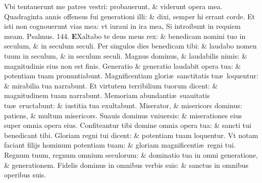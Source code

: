 \documentclass[a5paper,10pt]{book}
\def\ae{æ}
\begin{document}
\begin{multicols*}{2}
\newline \color{red} V\color{black}bi tentauerunt me patres vestri: probauerunt, \& viderunt opera mea. %
\newline \color{red} Q\color{black}uadraginta annis offensus fui generationi illi: \& dixi, semper hi errant corde.
\newline \color{red} E\color{black}t isti non cognouerunt vias mea: vt iuraui in ira mea, Si introibunt in requiem meam.%
\quad \color{red} Psalmus. \hypertarget{ps144}{144.}\color{black}
\lettrine[lines=2]{\bfseries \color{red} E}{}Xaltabo te deus meus rex: \& benedicam nomini tuo in seculum, \& in seculum seculi.
\newline \color{red} P\color{black}er singulos dies benedicam tibi: \& laudabo nomen tuum in seculum, \& in seculum seculi.
\newline \color{red} M\color{black}agnus dominus, \& laudabilis nimis: \& magnitudinis eius non est finis.
\newline \color{red} G\color{black}eneratio \& generatio laudabit opera tua: \& potentiam tuam pronuntiabunt.
\newline \color{red} M\color{black}agnificentiam glori\ae \ sanctitatis tu\ae \ loquentur: \& mirabilia tua narrabunt.
\newline \color{red} E\color{black}t virtutem terribilium tuorum dicent: \& magnitudinem tuam narrabunt.
\newline \color{red} M\color{black}emoriam abundanti\ae \ suauitatis tu\ae \ eructabunt: \& iustitia tua exultabunt.
\newline \color{red} M\color{black}iserator, \& misericors dominus: patiens, \& multum misericors.
\newline \color{red} S\color{black}uauis dominus vniuersis: \& miserationes eius super omnia opera eius.
\newline \color{red} C\color{black}onfiteantur tibi domine omnia opera tua: \& sancti tui benedicant tibi.
\newline \color{red} G\color{black}loriam regni tui dicent: \& potentiam tuam loquentur.
\newline \color{red} V\color{black}t notam faciant filijs hominum potentiam tuam: \& gloriam magnificenti\ae \ regni tui.
\newline \color{red} R\color{black}egnum tuum, regnum omnium seculorum: \& dominatio tua in omni generatione, \& generationem.
\newline \color{red} F\color{black}idelis dominus in omnibus verbis suis: \& sanctus in omnibus operibus suis.

\end{multicols*}
\end{document}
